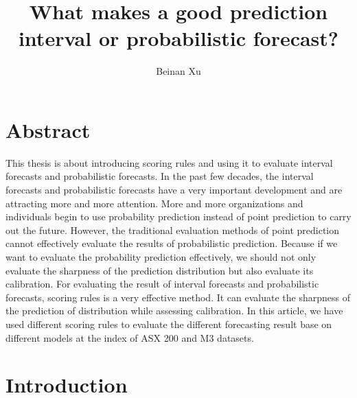 \documentclass{monashthesis}
\author{Beinan Xu}
\title{What makes a good prediction interval or probabilistic forecast?}
\theoremstyle{definition}
\theoremstyle{definition}
\theoremstyle{definition}
\theoremstyle{remark}
\begin{document}

\titlepage

{\sf\tighttoc\doublespacing}

\clearpage{}\setcounter{page}{0}

\chapter*{Abstract}\label{abstract}

This thesis is about introducing scoring rules and using it to evaluate
interval forecasts and probabilistic forecasts. In the past few decades,
the interval forecasts and probabilistic forecasts have a very important
development and are attracting more and more attention. More and more
organizations and individuals begin to use probability prediction
instead of point prediction to carry out the future. However, the
traditional evaluation methods of point prediction cannot effectively
evaluate the results of probabilistic prediction. Because if we want to
evaluate the probability prediction effectively, we should not only
evaluate the sharpness of the prediction distribution but also evaluate
its calibration. For evaluating the result of interval forecasts and
probabilistic forecasts, scoring rules is a very effective method. It
can evaluate the sharpness of the prediction of distribution while
assessing calibration. In this article, we have used different scoring
rules to evaluate the different forecasting result base on different
models at the index of ASX 200 and M3 datasets.

\chapter{Introduction}\label{ch:intro}
\end{document}
